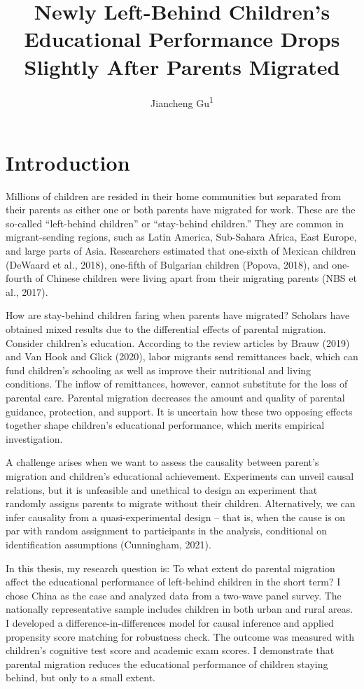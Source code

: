 \documentclass[
  man,floatsintext]{apa7}
\title{Newly Left-Behind Children's Educational Performance Drops Slightly After Parents Migrated}
\author{Jiancheng Gu\textsuperscript{1}}
\date{}
\affiliation{\vspace{0.5cm}\textsuperscript{1} Faculty of Social Sciences, Vrije Universiteit Amsterdam}
\begin{document}
\maketitle

\hypertarget{introduction}{%
\section{Introduction}\label{introduction}}

Millions of children are resided in their home communities but separated from their parents as either one or both parents have migrated for work. These are the so-called ``left-behind children'' or ``stay-behind children.'' They are common in migrant-sending regions, such as Latin America, Sub-Sahara Africa, East Europe, and large parts of Asia. Researchers estimated that one-sixth of Mexican children (DeWaard et al., 2018), one-fifth of Bulgarian children (Popova, 2018), and one-fourth of Chinese children were living apart from their migrating parents (NBS et al., 2017).

How are stay-behind children faring when parents have migrated? Scholars have obtained mixed results due to the differential effects of parental migration. Consider children's education. According to the review articles by Brauw (2019) and Van Hook and Glick (2020), labor migrants send remittances back, which can fund children's schooling as well as improve their nutritional and living conditions. The inflow of remittances, however, cannot substitute for the loss of parental care. Parental migration decreases the amount and quality of parental guidance, protection, and support. It is uncertain how these two opposing effects together shape children's educational performance, which merits empirical investigation.

A challenge arises when we want to assess the causality between parent's migration and children's educational achievement. Experiments can unveil causal relations, but it is unfeasible and unethical to design an experiment that randomly assigns parents to migrate without their children. Alternatively, we can infer causality from a quasi-experimental design -- that is, when the cause is on par with random assignment to participants in the analysis, conditional on identification assumptions (Cunningham, 2021).

In this thesis, my research question is: To what extent do parental migration affect the educational performance of left-behind children in the short term? I chose China as the case and analyzed data from a two-wave panel survey. The nationally representative sample includes children in both urban and rural areas. I developed a difference-in-differences model for causal inference and applied propensity score matching for robustness check. The outcome was measured with children's cognitive test score and academic exam scores. I demonstrate that parental migration reduces the educational performance of children staying behind, but only to a small extent.
\end{document}
